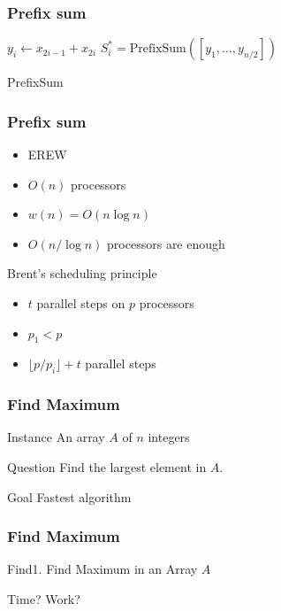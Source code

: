 \documentclass[14pt,aspectratio=169]{beamer}
\begin{document}
\begin{frame}\frametitle{Prefix sum}
\begin{algorithm}[H]

{
  $y_{i}\gets x_{2i-1} + x_{2i}$\;
}
$S^{*}_{i} = \text{PrefixSum}([y_{1}, \ldots , y_{n/2}])$\;
{
}
\caption{PrefixSum}
\end{algorithm}
\end{frame}


\begin{frame}\frametitle{Prefix sum}
  \begin{itemize}
  \item
    EREW
  \item
    $O(n)$ processors
  \item
    $w(n) = O(n\log n)$
  \item
    $O(n/\log n)$ processors are enough
  \end{itemize}

\begin{block}{Brent's scheduling principle}
  \begin{itemize}
  \item
    $t$ parallel steps on $p$ processors
  \item
    $p_{1}<p$
  \item
    $\lfloor p/p_{i}\rfloor +t$ parallel steps
  \end{itemize}
\end{block}
\end{frame}

\begin{frame}\frametitle{Find Maximum}
\begin{block}{Instance}
An array $A$ of $n$ integers
\end{block}
\begin{block}{Question}
Find the largest element in $A$.    
\end{block}
\begin{block}{Goal}
Fastest algorithm
\end{block}
\end{frame}

\begin{frame}\frametitle{Find Maximum}
\begin{algorithm}[H]
\caption{Find1.    
Find Maximum in an Array $A$}
\end{algorithm}
Time? Work? 
\end{frame}
\end{document}
